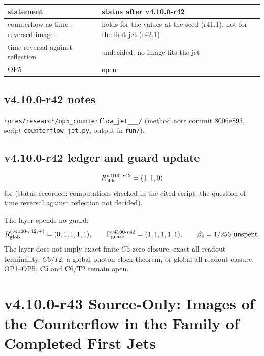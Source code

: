 \begin{center}
\small
\begin{tabular}{@{}>{\raggedright\arraybackslash}p{}>{\raggedright\arraybackslash}p{}@{}}
\toprule
statement & status after v4.10.0-r42\\
\midrule
counterflow as time-reversed image & holds for the values at the seed (r41.1), not for the first jet (r42.1)\\
time reversal against reflection & undecided; no image fits the jet\\
OP5 & open\\
\bottomrule
\end{tabular}
\end{center}

\subsection*{v4.10.0-r42 notes}
\label{subsec:v4100-r42-notes}

\texttt{notes/\allowbreak research/\allowbreak op5\_\allowbreak counterflow\_\allowbreak jet\_\_\_/} (method note commit 8006e893,
script \texttt{counterflow\_\allowbreak jet.py}, output in \texttt{run/}).

\subsection*{v4.10.0-r42 ledger and guard update}
\label{subsec:v4100-r42-ledger-guard}

\[
R_{\rm chk}^{v4100\text{-}r42}=(1,1,0)
\]
for (status recorded; computations checked in the cited script; the question of time reversal against reflection not decided).

The layer spends no guard:
\[
R_{\rm glob}^{(v4100\text{-}r42,+)}=(0,1,1,1,1),
\qquad
\Gamma_{\rm guard}^{v4100\text{-}r42}=(1,1,1,1,1),
\qquad
\beta_4=1/256\ \text{unspent}.
\]
The layer does not imply exact finite \(C5\) zero closure, exact all-readout terminality, \(C6/T2\), a global photon-clock theorem,
or global all-readout closure.  OP1--OP5, C5 and C6/T2 remain open.

\clearpage
\section*{v4.10.0-r43 Source-Only: Images of the Counterflow in the Family of Completed First Jets}
\label{sec:v4100-r43-jet-family}

